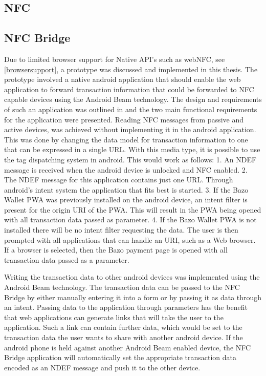 \subsection{NFC}
\subsection{NFC Bridge}\label{nfcbridge}
Due to limited browser support for Native API's such as webNFC, see \ref{browsersupport}, a prototype was discussed and implemented in this thesis. The prototype involved a native android application that should enable the web application to forward transaction information that could be forwarded to NFC capable devices using the Android Beam technology.
The design and requirements of such an application was outlined in \cite{undefined} and the two main functional requirements for the application were presented.
Reading NFC messages from passive and active devices, was achieved without implementing it in the android application. This was done by changing the data model for transaction information to one that can be expressed in a single URL. With this media type, it is possible to use the tag dispatching system in android. This would work as follows:
1. An NDEF message is received when the android device is unlocked and NFC enabled.
2. The NDEF message for this application contains just one URL. Through android's intent system the application that fits best is started.
3. If the Bazo Wallet PWA was previously installed on the android device, an intent filter is present for the origin URI of the PWA. This will result in the PWA being opened with all transaction data passed as parameter.
4. If the Bazo Wallet PWA is not installed there will be no intent filter requesting the data. The user is then prompted with all applications that can handle an URI, such as a Web browser. If a browser is selected, then the Bazo payment page is opened with all transaction data passed as a parameter.

Writing the transaction data to other android devices was implemented using the Android Beam technology.
The transaction data can be passed to the NFC Bridge by either manually entering it into a form or by passing it as data through an intent. Passing data to the application through parameters has the benefit that web applications can generate links that will take the user to the application. Such a link can contain further data, which would be set to the transaction data the user wants to share with another android device.
If the android phone is held against another Android Beam enabled device, the NFC Bridge application will automatically set the appropriate transaction data encoded as an NDEF message and push it to the other device.

